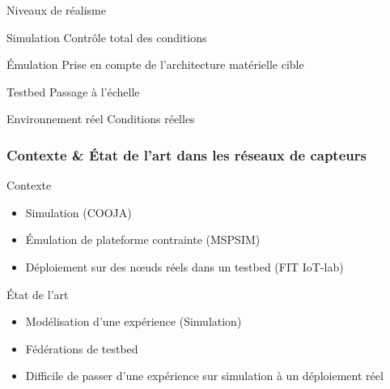\begin{frame}{Niveaux de réalisme}
  \begin{block}{Simulation}
   Contrôle total des conditions
  \end{block}
  \begin{block}{Émulation}
    Prise en compte de l'architecture matérielle cible
  \end{block}
  \begin{block}{Testbed}
   Passage à l'échelle
  \end{block}
  \begin{block}{Environnement réel}
    Conditions réelles
  \end{block}

\end{frame}

\begin{frame}\frametitle{Contexte \& État de l'art dans les réseaux de capteurs}

  \begin{block}{Contexte}
    \begin{itemize}
      \item Simulation (COOJA)
      \item Émulation de plateforme contrainte (MSPSIM)
      \item Déploiement sur des nœuds réels dans un testbed (FIT IoT-lab)
    \end{itemize}
  \end{block}

  \begin{block}{État de l'art}
    \begin{itemize}
      \item Modélisation d'une expérience (Simulation)
      \item Fédérations de testbed
      \item Difficile de passer d'une expérience sur simulation à un déploiement réel
    \end{itemize}
  \end{block}


\end{frame}

